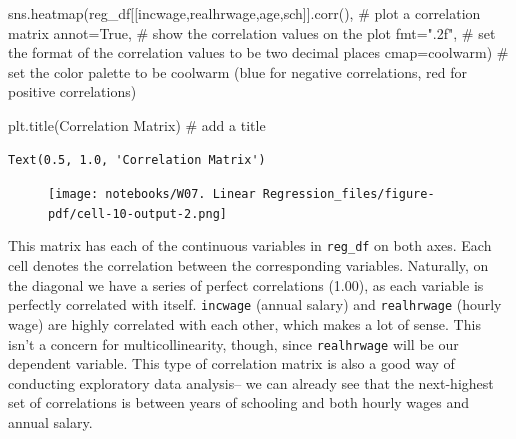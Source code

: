 \documentclass[
  letterpaper,
  DIV=11,
  numbers=noendperiod]{scrreprt}
\newenvironment{Shaded}{\begin{snugshade}}{\end{snugshade}}
\newcommand{\CommentTok}[1]{\textcolor[rgb]{0.37,0.37,0.37}{#1}}
\newcommand{\NormalTok}[1]{\textcolor[rgb]{0.00,0.23,0.31}{#1}}
\newcommand{\OperatorTok}[1]{\textcolor[rgb]{0.37,0.37,0.37}{#1}}
\newcommand{\StringTok}[1]{\textcolor[rgb]{0.13,0.47,0.30}{#1}}
\newcommand{\VariableTok}[1]{\textcolor[rgb]{0.07,0.07,0.07}{#1}}
\begin{document}
\begin{Shaded}
\begin{Highlighting}[]
\NormalTok{sns.heatmap(reg\_df[[}\StringTok{\textquotesingle{}incwage\textquotesingle{}}\NormalTok{,}\StringTok{\textquotesingle{}realhrwage\textquotesingle{}}\NormalTok{,}\StringTok{\textquotesingle{}age\textquotesingle{}}\NormalTok{,}\StringTok{\textquotesingle{}sch\textquotesingle{}}\NormalTok{]].corr(), }\CommentTok{\# plot a correlation matrix }
\NormalTok{            annot}\OperatorTok{=}\VariableTok{True}\NormalTok{, }\CommentTok{\# show the correlation values on the plot}
\NormalTok{            fmt}\OperatorTok{=}\StringTok{".2f"}\NormalTok{, }\CommentTok{\# set the format of the correlation values to be two decimal places}
\NormalTok{            cmap}\OperatorTok{=}\StringTok{\textquotesingle{}coolwarm\textquotesingle{}}\NormalTok{) }\CommentTok{\# set the color palette to be coolwarm (blue for negative correlations, red for positive correlations)}

\NormalTok{plt.title(}\StringTok{\textquotesingle{}Correlation Matrix\textquotesingle{}}\NormalTok{) }\CommentTok{\# add a title}
\end{Highlighting}
\end{Shaded}

\begin{verbatim}
Text(0.5, 1.0, 'Correlation Matrix')
\end{verbatim}

\begin{figure}[H]

{\centering \texttt{[image: notebooks/W07. Linear Regression\_files/figure-pdf/cell-10-output-2.png]}

}

\end{figure}

This matrix has each of the continuous variables in \texttt{reg\_df} on
both axes. Each cell denotes the correlation between the corresponding
variables. Naturally, on the diagonal we have a series of perfect
correlations (1.00), as each variable is perfectly correlated with
itself. \texttt{incwage} (annual salary) and \texttt{realhrwage} (hourly
wage) are highly correlated with each other, which makes a lot of sense.
This isn't a concern for multicollinearity, though, since
\texttt{realhrwage} will be our dependent variable. This type of
correlation matrix is also a good way of conducting exploratory data
analysis-- we can already see that the next-highest set of correlations
is between years of schooling and both hourly wages and annual salary.
\end{document}
